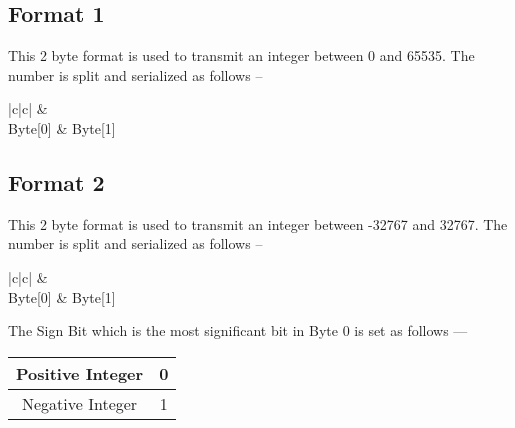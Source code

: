 
\subsection{Format 1}

This 2 byte format is used to transmit an integer between 0 and 65535. The
number is split and serialized as follows --\\

\begin{table}[H]
\centering
\begin{tabular}{|c|c|}
\hline
 &
   \\
Byte[0] & Byte[1] \\
\hline
\end{tabular}
\end{table}


\subsection{Format 2}
This 2 byte format is used to transmit an integer between -32767 and 32767. The
number is split and serialized as follows --\\

\begin{table}[H]
\centering
\begin{tabular}{|c|c|}
\hline
 &
 \\
Byte[0] & Byte[1] \\
\hline
\end{tabular}
\end{table}

The Sign Bit which is the most significant bit in Byte 0 is set as follows ---

\begin{table}[H]
\centering
\begin{tabular}{|c|c|}
\hline
Positive Integer & 0 \\ 
\hline
Negative Integer & 1 \\
\hline
\end{tabular}
\end{table}



